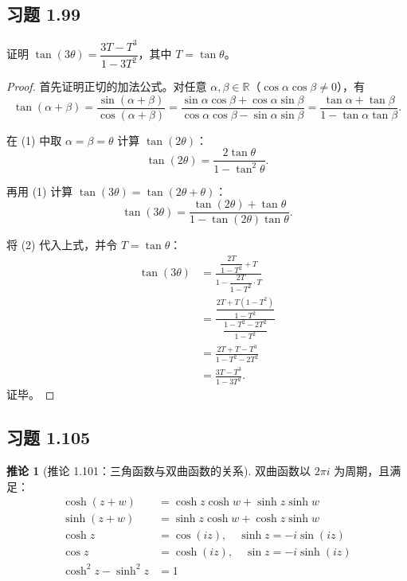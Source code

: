 \documentclass[11pt,a4paper]{article}
\newcommand{\R}{\mathbb{R}}
\theoremstyle{definition}
\newtheorem{corollary}[theorem]{推论}
\begin{document}
\subsection{习题 1.99}

证明 $\tan(3\theta) = \dfrac{3T - T^3}{1 - 3T^2}$，其中 $T = \tan \theta$。

\begin{proof}
首先证明正切的加法公式。对任意 $\alpha, \beta \in \R$（$\cos\alpha\cos\beta \neq 0$），有
\[
  \tan(\alpha + \beta)
  = \frac{\sin(\alpha + \beta)}{\cos(\alpha + \beta)}
  = \frac{\sin\alpha\cos\beta + \cos\alpha\sin\beta}
  {\cos\alpha\cos\beta - \sin\alpha\sin\beta}
  = \frac{\tan\alpha + \tan\beta}{1 - \tan\alpha\tan\beta}.
  \tag{1}
\]

在 (1) 中取 $\alpha = \beta = \theta$ 计算 $\tan(2\theta)$：
\[
  \tan(2\theta) = \frac{2\tan\theta}{1 - \tan^2\theta}.
  \tag{2}
\]

再用 (1) 计算 $\tan(3\theta) = \tan(2\theta + \theta)$：
\[
  \tan(3\theta)
  = \frac{\tan(2\theta) + \tan\theta}{1 - \tan(2\theta)\tan\theta}.
\]

将 (2) 代入上式，并令 $T = \tan\theta$：
\[
  \begin{aligned}
    \tan(3\theta)
    &= \frac{\dfrac{2T}{1 - T^2} + T}{1 - \dfrac{2T}{1 - T^2} \cdot T} \\
    &= \frac{\dfrac{2T + T(1 - T^2)}{1 - T^2}}
    {\dfrac{1 - T^2 - 2T^2}{1 - T^2}} \\
    &= \frac{2T + T - T^3}{1 - T^2 - 2T^2} \\
    &= \frac{3T - T^3}{1 - 3T^2}.
  \end{aligned}
\]
证毕。
\end{proof}

\subsection{习题 1.105}

\begin{corollary}[推论 1.101：三角函数与双曲函数的关系]
  双曲函数以 $2\pi i$ 为周期，且满足：
  \begin{align*}
    \cosh(z+w)       & = \cosh z \cosh w + \sinh z \sinh w \\
    \sinh(z+w)       & = \sinh z \cosh w + \cosh z \sinh w \\
    \cosh z          & = \cos(iz), \quad \sinh z = -i \sin(iz) \\
    \cos z           & = \cosh(iz), \quad \sin z = -i \sinh(iz) \\
    \cosh^2 z - \sinh^2 z & = 1
  \end{align*}
\end{corollary}
\end{document}
